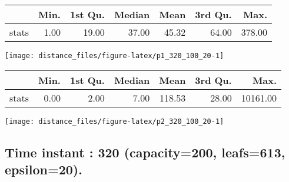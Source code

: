 \documentclass[
  9pt,
  landscape]{article}
\begin{document}
\begin{minipage}{0.5\textwidth} 
\centering 
\begin{tabular}{rrrrrrr}
  \hline
 & Min. & 1st Qu. & Median & Mean & 3rd Qu. & Max. \\ 
  \hline
stats & 1.00 & 19.00 & 37.00 & 45.32 & 64.00 & 378.00 \\ 
   \hline
\end{tabular}
\vspace{0.5cm} 


\texttt{[image: distance\_files/figure-latex/p1\_320\_100\_20-1]} 

\end{minipage} 
\begin{minipage}{0.5\textwidth} 
\centering 
\begin{tabular}{rrrrrrr}
  \hline
 & Min. & 1st Qu. & Median & Mean & 3rd Qu. & Max. \\ 
  \hline
stats & 0.00 & 2.00 & 7.00 & 118.53 & 28.00 & 10161.00 \\ 
   \hline
\end{tabular}
\vspace{0.5cm} 


\texttt{[image: distance\_files/figure-latex/p2\_320\_100\_20-1]} 

\end{minipage}

\pagebreak

\hypertarget{time-instant-320-capacity200-leafs613-epsilon20.}{%
\subsection{Time instant : 320 (capacity=200, leafs=613,
epsilon=20).}\label{time-instant-320-capacity200-leafs613-epsilon20.}}
\end{document}
